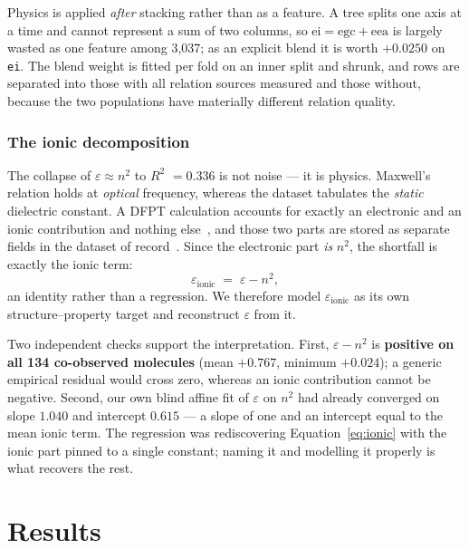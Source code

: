 \documentclass[11pt,a4paper]{article}
\newcommand{\prop}[1]{\texttt{#1}}
\newcommand{\R}{$R^2$}
\begin{document}
Physics is applied \emph{after} stacking rather than as a feature. A tree splits
one axis at a time and cannot represent a sum of two columns, so
$\text{ei} = \text{egc} + \text{eea}$ is largely wasted as one feature among
3{,}037; as an explicit blend it is worth $+0.0250$ on \prop{ei}. The blend
weight is fitted per fold on an inner split and shrunk, and rows are separated
into those with all relation sources measured and those without, because the
two populations have materially different relation quality.

\subsubsection*{The ionic decomposition}

The collapse of $\varepsilon \approx n^2$ to \R{} $= 0.336$ is not noise --- it is
physics. Maxwell's relation holds at \emph{optical} frequency, whereas the
dataset tabulates the \emph{static} dielectric constant. A DFPT calculation
accounts for exactly an electronic and an ionic contribution and nothing
else~\cite{chen2020}, and those two parts are stored as separate fields in the
dataset of record~\cite{huan2016}. Since the electronic part \emph{is} $n^2$,
the shortfall is exactly the ionic term:
\begin{equation}
  \varepsilon_{\text{ionic}} \;=\; \varepsilon - n^2 ,
  \label{eq:ionic}
\end{equation}
an identity rather than a regression. We therefore model
$\varepsilon_{\text{ionic}}$ as its own structure--property target and
reconstruct $\varepsilon$ from it.

Two independent checks support the interpretation. First, $\varepsilon - n^2$ is
\textbf{positive on all 134 co-observed molecules} (mean $+0.767$, minimum
$+0.024$); a generic empirical residual would cross zero, whereas an ionic
contribution cannot be negative. Second, our own blind affine fit of
$\varepsilon$ on $n^2$ had already converged on slope $1.040$ and intercept
$0.615$ --- a slope of one and an intercept equal to the mean ionic term. The
regression was rediscovering Equation~\ref{eq:ionic} with the ionic part pinned
to a single constant; naming it and modelling it properly is what recovers the
rest.

\section{Results}
\end{document}
